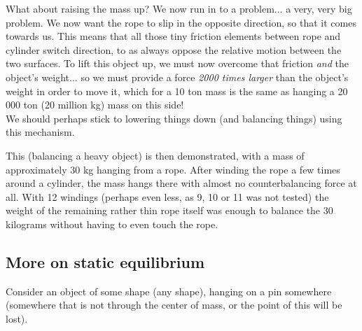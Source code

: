 What about raising the mass up? We now run in to a problem... a very, very big problem. We now want the rope to slip in the opposite direction, so that it comes towards us. This means that all those tiny friction elements between rope and cylinder switch direction, to as always oppose the relative motion between the two surfaces. To lift this object up, we must now overcome that friction \emph{and} the object's weight... so we must provide a force \emph{2000 times larger} than the object's weight in order to move it, which for a 10 ton mass is the same as hanging a 20 000 ton (20 million kg) mass on this side!\\
We should perhaps stick to lowering things down (and balancing things) using this mechanism.

This (balancing a heavy object) is then demonstrated, with a mass of approximately 30 kg hanging from a rope. After winding the rope a few times around a cylinder, the mass hangs there with almost no counterbalancing force at all. With 12 windings (perhaps even less, as 9, 10 or 11 was not tested) the weight of the remaining rather thin rope itself was enough to balance the 30 kilograms without having to even touch the rope.

\subsection{More on static equilibrium}

Consider an object of some shape (any shape), hanging on a pin somewhere (somewhere that is not through the center of mass, or the point of this will be lost).

\begin{figure}[H]
  \centering
{}
\end{figure}

